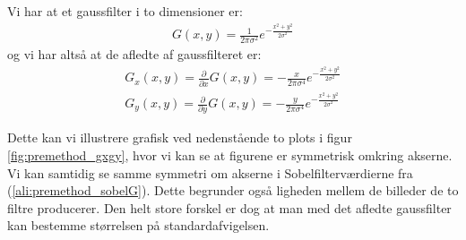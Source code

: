 Vi har at et gaussfilter i to dimensioner er:
\begin{align}
	G(x,y) = \frac{1}{2\pi\sigma^2}e^{-\frac{x^2+y^2}{2\sigma^2}}
\end{align}
og vi har altså at de afledte af gaussfilteret er:
\begin{align}
	G_x(x,y) = \frac{\partial}{\partial x}G(x,y)=-\frac{x}{2\pi\sigma^4}e^{-\frac{x^2+y^2}{2\sigma^2}} \label{ali:premethod_gauss}\\
	G_y(x,y) = \frac{\partial}{\partial y}G(x,y)=-\frac{y}{2\pi\sigma^4}e^{-\frac{x^2+y^2}{2\sigma^2}}
\end{align}

Dette kan vi illustrere grafisk ved nedenstående to plots i figur \ref{fig:premethod_gxgy}, hvor vi kan se at figurene er symmetrisk omkring akserne. Vi kan samtidig se samme symmetri om akserne i Sobelfilterværdierne fra (\ref{ali:premethod_sobelG}). Dette begrunder også ligheden mellem de billeder de to filtre producerer. Den helt store forskel er dog at man med det afledte gaussfilter kan bestemme størrelsen på standardafvigelsen. 

